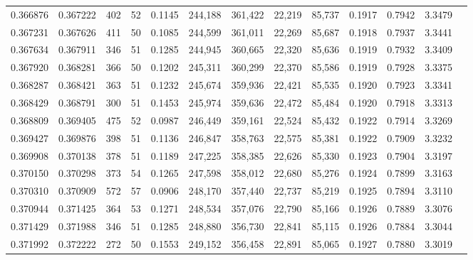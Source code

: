 \begin{tabular}{rrrrrrrrrrrrr}
0.366876 & 0.367222 &    402 &    52 &                                     0.1145 & 244,188 & 361,422 &  22,219 &  85,737 & 0.1917 & 0.7942 & 3.3479 \\
0.367231 & 0.367626 &    411 &    50 &                                     0.1085 & 244,599 & 361,011 &  22,269 &  85,687 & 0.1918 & 0.7937 & 3.3441 \\
0.367634 & 0.367911 &    346 &    51 &                                     0.1285 & 244,945 & 360,665 &  22,320 &  85,636 & 0.1919 & 0.7932 & 3.3409 \\
0.367920 & 0.368281 &    366 &    50 &                                     0.1202 & 245,311 & 360,299 &  22,370 &  85,586 & 0.1919 & 0.7928 & 3.3375 \\
0.368287 & 0.368421 &    363 &    51 &                                     0.1232 & 245,674 & 359,936 &  22,421 &  85,535 & 0.1920 & 0.7923 & 3.3341 \\
0.368429 & 0.368791 &    300 &    51 &                                     0.1453 & 245,974 & 359,636 &  22,472 &  85,484 & 0.1920 & 0.7918 & 3.3313 \\
0.368809 & 0.369405 &    475 &    52 &                                     0.0987 & 246,449 & 359,161 &  22,524 &  85,432 & 0.1922 & 0.7914 & 3.3269 \\
0.369427 & 0.369876 &    398 &    51 &                                     0.1136 & 246,847 & 358,763 &  22,575 &  85,381 & 0.1922 & 0.7909 & 3.3232 \\
0.369908 & 0.370138 &    378 &    51 &                                     0.1189 & 247,225 & 358,385 &  22,626 &  85,330 & 0.1923 & 0.7904 & 3.3197 \\
0.370150 & 0.370298 &    373 &    54 &                                     0.1265 & 247,598 & 358,012 &  22,680 &  85,276 & 0.1924 & 0.7899 & 3.3163 \\
0.370310 & 0.370909 &    572 &    57 &                                     0.0906 & 248,170 & 357,440 &  22,737 &  85,219 & 0.1925 & 0.7894 & 3.3110 \\
0.370944 & 0.371425 &    364 &    53 &                                     0.1271 & 248,534 & 357,076 &  22,790 &  85,166 & 0.1926 & 0.7889 & 3.3076 \\
0.371429 & 0.371988 &    346 &    51 &                                     0.1285 & 248,880 & 356,730 &  22,841 &  85,115 & 0.1926 & 0.7884 & 3.3044 \\
0.371992 & 0.372222 &    272 &    50 &                                     0.1553 & 249,152 & 356,458 &  22,891 &  85,065 & 0.1927 & 0.7880 & 3.3019 \\

\end{tabular}
